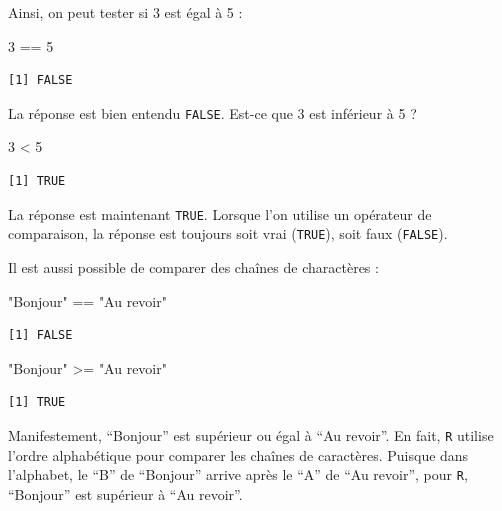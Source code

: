 \documentclass[
  a4paper,
  DIV=11,
  numbers=noendperiod,
  oneside]{scrreprt}
\newenvironment{Shaded}{}{}
\newcommand{\DecValTok}[1]{\textcolor[rgb]{0.00,0.36,0.77}{#1}}
\newcommand{\SpecialCharTok}[1]{\textcolor[rgb]{0.00,0.36,0.77}{#1}}
\newcommand{\StringTok}[1]{\textcolor[rgb]{0.01,0.18,0.38}{#1}}
\begin{document}
Ainsi, on peut tester si 3 est égal à 5 :

\begin{Shaded}
\begin{Highlighting}[]
\DecValTok{3} \SpecialCharTok{==} \DecValTok{5}
\end{Highlighting}
\end{Shaded}

\begin{verbatim}
[1] FALSE
\end{verbatim}

La réponse est bien entendu \texttt{FALSE}. Est-ce que 3 est inférieur à
5 ?

\begin{Shaded}
\begin{Highlighting}[]
\DecValTok{3} \SpecialCharTok{\textless{}} \DecValTok{5}
\end{Highlighting}
\end{Shaded}

\begin{verbatim}
[1] TRUE
\end{verbatim}

La réponse est maintenant \texttt{TRUE}. Lorsque l'on utilise un
opérateur de comparaison, la réponse est toujours soit vrai
(\texttt{TRUE}), soit faux (\texttt{FALSE}).

Il est aussi possible de comparer des chaînes de charactères :

\begin{Shaded}
\begin{Highlighting}[]
\StringTok{"Bonjour"} \SpecialCharTok{==} \StringTok{"Au revoir"}
\end{Highlighting}
\end{Shaded}

\begin{verbatim}
[1] FALSE
\end{verbatim}

\begin{Shaded}
\begin{Highlighting}[]
\StringTok{"Bonjour"} \SpecialCharTok{\textgreater{}=} \StringTok{"Au revoir"}
\end{Highlighting}
\end{Shaded}

\begin{verbatim}
[1] TRUE
\end{verbatim}

Manifestement, ``Bonjour'' est supérieur ou égal à ``Au revoir''. En
fait, \texttt{R} utilise l'ordre alphabétique pour comparer les chaînes
de caractères. Puisque dans l'alphabet, le ``B'' de ``Bonjour'' arrive
après le ``A'' de ``Au revoir'', pour \texttt{R}, ``Bonjour'' est
supérieur à ``Au revoir''.
\end{document}
